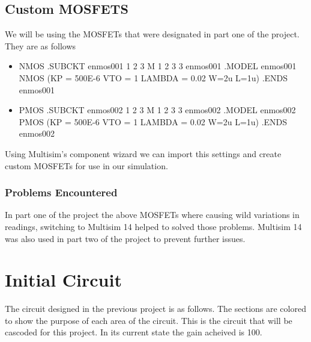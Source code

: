 \documentclass[12pt]{article}
\begin{document}
	
	\subsection{Custom MOSFETS}
	\label{sec:desigan_and_analysis}
	
	We will be using the MOSFETs that were designated in part one of the project. They are as follows
	
	\begin{itemize}
		\item NMOS \newline \newline
		.SUBCKT enmos001 1 2 3 \newline
		M 1 2 3 3 enmos001\newline
		.MODEL enmos001 NMOS (KP = 500E-6 VTO = 1 LAMBDA = 0.02 W=2u L=1u)\newline
		.ENDS enmos001
		\newline
		\item PMOS \newline \newline
		.SUBCKT enmos002 1 2 3 \newline
		M 1 2 3 3 enmos002\newline
		.MODEL enmos002 PMOS (KP = 500E-6 VTO = 1 LAMBDA = 0.02 W=2u L=1u)\newline
		.ENDS enmos002
		\newline
		
	\end{itemize}
	
	Using Multisim's component wizard we can import this settings and create custom MOSFETs for use in our simulation.
	
	\subsubsection{Problems Encountered}
	In part one of the project the above MOSFETs where causing wild variations in readings, switching to Multisim 14 helped to solved those problems. Multisim 14 was also used in part two of the project to prevent further issues.
	
	
	\section{Initial Circuit}
	The circuit designed in the previous project is as follows. The sections are colored to show the purpose of each area of the circuit. This is the circuit that will be cascoded for this project. In its current state the gain acheived is 100.
	
\end{document}
